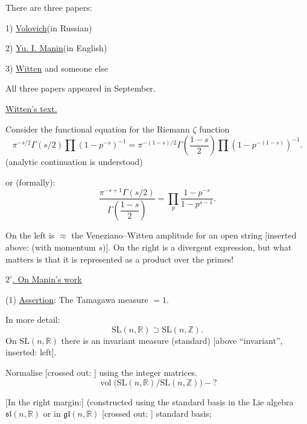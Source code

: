 There are three papers:

1) \underline{Volovich}\qquad (in Russian)

2) \underline{Yu. I. Manin}\qquad (in English)

3) \underline{Witten} and someone else

All three papers appeared in September.

\underline{Witten's text.}

Consider the functional equation for the Riemann $\zeta$ function
\begin{equation}
 \pi^{-s/2}\Gamma(s/2)\prod(1-p^{-s})^{-1}
 =
 \pi^{-(1-s)/2}\Gamma\left(\frac{1-s}{2}\right)
 \prod(1-p^{-(1-s)})^{-1}.
 \tag{2}
\end{equation}
(analytic continuation is understood)

or (formally):
\begin{equation}
 \frac{\pi^{-s+1}\Gamma(s/2)}
 {\Gamma\left(\dfrac{1-s}{2}\right)}
 =
 \prod_p\frac{1-p^{-s}}{1-p^{s-1}}.
 \tag{3}
\end{equation}

On the left is $\approx$ the Veneziano–Witten amplitude for an open
string [inserted above: (with momentum $s$)].
On the right is a divergent expression, but what matters is
that it is represented as a product over the primes!


\underline{$2^{\circ}$. On Manin's work}

(1) \underline{Assertion}: The Tamagawa measure $=1$.

In more detail:
\begin{equation*}
 \mathrm{SL}(n,\mathbb R)\supset\mathrm{SL}(n,\mathbb Z).
\end{equation*}
On $\mathrm{SL}(n,\mathbb R)$ there is an invariant measure (standard)
[above “invariant”, inserted: left].

Normalise [crossed out:
]
using the integer matrices.
\begin{equation*}
 \operatorname{vol}\bigl(\mathrm{SL}(n,\mathbb R)/\mathrm{SL}(n,\mathbb Z)\bigr)-?
\end{equation*}

[In the right margin:]
(constructed using the standard basis in the Lie algebra
$\mathfrak{sl}(n,\mathbb R)$ or in $\mathfrak{gl}(n,\mathbb R)$
[crossed out: ]
standard basis;
\begin{center}
\end{center}


